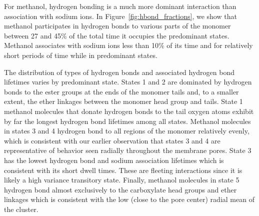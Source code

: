 \documentclass[journal=jpcbfk,manuscript=article]{achemso}
\begin{document}
  For methanol, hydrogen bonding is a much more dominant interaction than association
  with sodium ions. In Figure~\ref{fig:hbond_fractions}, we show that methanol 
  participates in hydrogen bonds to various parts of the monomer between 27 and
  45\% of the total time it occupies the predominant states. Methanol associates 
  with sodium ions less than 10\% of its time and for relatively short periods 
  of time while in predominant states. 
  
  The distribution of types of hydrogen bonds and associated hydrogen bond lifetimes
  varies by predominant state. States 1 and 2 are dominated by hydrogen bonds to the 
  ester groups at the ends of the monomer tails and, to a smaller extent, the ether 
  linkages between the monomer head group and tails. State 1 methanol molecules that
  donate hydrogen bonds to the tail oxygen atoms exhibit by far the longest hydrogen
  bond lifetimes among all states. Methanol molecules in states 3 and 4 hydrogen 
  bond to all regions of the monomer relatively evenly, which is consistent with our earlier observation that
  states 3 and 4 are representative of behavior seen radially throughout the membrane
  pores. State 3 has the lowest hydrogen bond and sodium association lifetimes which
  is consistent with its short dwell times. These are fleeting interactions since it
  is likely a high variance transitory state. Finally, methanol molecules in state 5
  hydrogen bond almost exclusively to the carboxylate head groups and ether linkages 
  which is consistent with the low (close to the pore center) radial mean of the 
  cluster.
  
\end{document}
